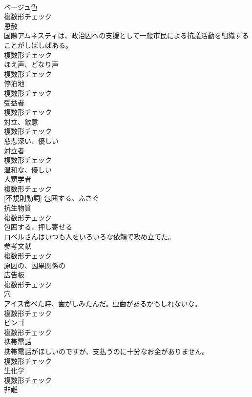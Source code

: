 \documentclass[8pt]{extreport}
\begin{document}
\begin{CJK}{UTF8}{min}
\\	[名詞]	ベージュ色	
\\	複数形チェック
\\	[名詞]	恩赦	
\\	国際アムネスティは、政治囚への支援として一般市民による抗議活動を組織することがしばしばある。	
\\	複数形チェック
\\	[名詞]	ほえ声、どなり声	
\\	複数形チェック
\\	[名詞]	停泊地	
\\	複数形チェック
\\	[名詞]	受益者	
\\	複数形チェック
\\	[名詞]	対立、敵意	
\\	複数形チェック
\\	[形容詞]	慈悲深い、優しい	
\\	[名詞]	対立者	
\\	複数形チェック
\\	[形容詞]	温和な、優しい	
\\	[名詞]	人類学者	
\\	複数形チェック
\\	[動詞] [不規則動詞]	包囲する、ふさぐ	
\\	[名詞]	抗生物質	
\\	複数形チェック
\\	[動詞]	包囲する、押し寄せる	
\\	ロベルさんはいつも人をいろいろな依頼で攻め立てた。	
\\	[名詞]	参考文献	
\\	複数形チェック
\\	[形容詞]	原因の、因果関係の	
\\	[名詞]	広告板	
\\	複数形チェック
\\	[名詞]	穴	
\\	アイス食べた時、歯がしみたんだ。虫歯があるかもしれないな。	
\\	複数形チェック
\\	[名詞]	ビンゴ	
\\	複数形チェック
\\	[名詞]	携帯電話	
\\	携帯電話がほしいのですが、支払うのに十分なお金がありません。	
\\	複数形チェック
\\	[名詞]	生化学	
\\	複数形チェック
\\	[名詞]	非難	

\end{CJK}
\end{document}
